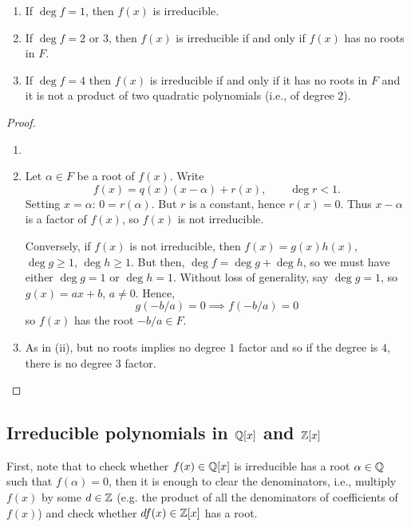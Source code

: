 \documentclass[10pt, a4paper]{article}
\begin{document}
\begin{proposition}\phantom{}
    \begin{enumerate}[label = (\roman*)]
        \item If $\deg{f} = 1$,
        then $f(x)$ is irreducible.

        \item If $\deg{f} = 2$ or $3$,
        then $f(x)$ is irreducible if and only if $f(x)$ has no roots in $F$.

        \item If $\deg{f} = 4$ then $f(x)$ is irreducible if and only if it has no roots in $F$ and it is not a product of two quadratic polynomials
        (i.e.,
        of degree $2$).
    \end{enumerate}

    \begin{proof}\phantom{}
        \begin{enumerate}[label = (\roman*)]
            \item \phantom{}

            \item Let $\alpha \in F$ be a root of $f(x)$.
            Write
            \[
            f(x) = q(x)(x - \alpha) + r(x),\qquad \deg{r} < 1.
            \]
            Setting $x = \alpha$:
            $0 = r(\alpha)$.
            But $r$ is a constant,
            hence $r(x) = 0$.
            Thus $x - \alpha$ is a factor of $f(x)$,
            so $f(x)$ is not irreducible.

            Conversely,
            if $f(x)$ is not irreducible,
            then $f(x) = g(x)h(x)$,
            $\deg{g} \geq 1$,
            $\deg{h} \geq 1$.
            But then,
            $\deg{f} = \deg{g} + \deg{h}$,
            so we must have either $\deg{g} = 1$ or $\deg{h} = 1$.
            Without loss of generality,
            say $\deg{g} = 1$,
            so $g(x) = ax + b$,
            $a \neq 0$.
            Hence,
            \[
            g(-b / a) = 0 \implies f(-b / a) = 0
            \]
            so $f(x)$ has the root $-b / a \in F$.

            \item As in (ii),
            but no roots implies no degree $1$ factor and so if the degree is $4$,
            there is no degree $3$ factor.
        \end{enumerate}
    \end{proof}
\end{proposition}

\subsection{Irreducible polynomials in \texorpdfstring{$\mathbb{Q}[x]$}{} and \texorpdfstring{$\mathbb{Z}[x]$}{}}
First,
note that to check whether $f(x) \in \mathbb{Q}[x]$ is irreducible has a root $\alpha \in \mathbb{Q}$ such that $f(\alpha) = 0$,
then it is enough to clear the denominators,
i.e.,
multiply $f(x)$ by some $d \in \mathbb{Z}$
(e.g. the product of all the denominators of coefficients of $f(x)$)
and check whether $df(x) \in \mathbb{Z}[x]$ has a root.
\end{document}
